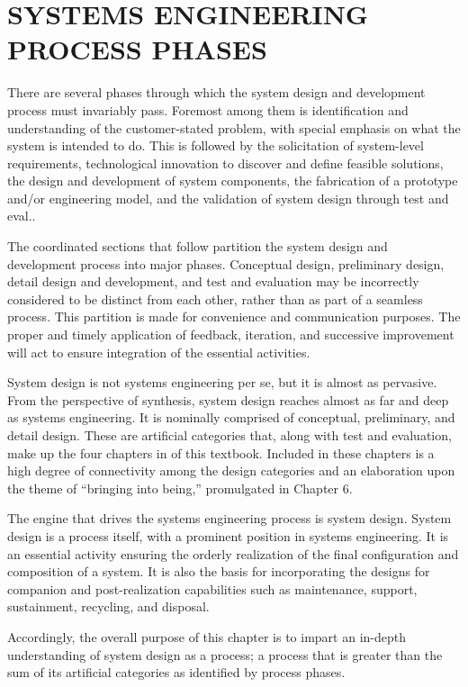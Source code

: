\chapter{SYSTEMS ENGINEERING PROCESS PHASES}\label{chap:8}

There are several phases through which the system design and development process must invariably pass. Foremost among them is identification and understanding of the customer-stated problem, with special emphasis on what the system is intended to do. This is followed by the solicitation of system-level requirements, technological innovation to discover and define feasible solutions, the design and development of system components, the fabrication of a prototype and/or engineering model, and the validation of system design through test and eval..

The coordinated sections that follow partition the system design and development process into major phases. Conceptual design, preliminary design, detail design and development, and test and evaluation may be incorrectly considered to be distinct from each other, rather than as part of a seamless process. This partition is made for convenience and communication purposes. The proper and timely application of feedback, iteration, and successive improvement will act to ensure integration of the essential activities.

System design is not systems engineering per se, but it is almost as pervasive. From the perspective of synthesis, system design reaches almost as far and deep as systems engineering. It is nominally comprised of conceptual, preliminary, and detail design. These are artificial categories that, along with test and evaluation, make up the four chapters in of this textbook. Included in these chapters is a high degree of connectivity among the design categories and an elaboration upon the theme of ``bringing into being,'' promulgated in Chapter 6.

The engine that drives the systems engineering process is system design. System design is a process itself, with a prominent position in systems engineering. It is an essential activity ensuring the orderly realization of the final configuration and composition of a system. It is also the basis for incorporating the designs for companion and post-realization capabilities such as maintenance, support, sustainment, recycling, and disposal.

Accordingly, the overall purpose of this chapter is to impart an in-depth understanding of system design as a process; a process that is greater than the sum of its artificial categories as identified by process phases.

